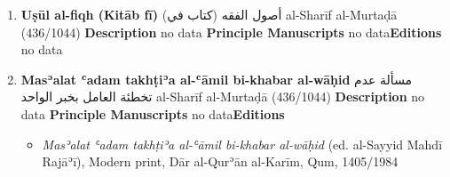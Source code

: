 \documentclass{article}
\begin{document}
\begin{enumerate}
      \item \textbf{Uṣūl al-fiqh (Kitāb fī)}
        \newline
        \textarabic{أصول الفقه (كتاب في)}
        \newline
        al-Sharīf al-Murtaḍā
        \newline
        (436/1044)
        \newline
        \newline
        \textbf{Description}
        \newline	
        no data
        \newline
        \newline
    \textbf{Principle Manuscripts}
\newline
no data\newline\textbf{Editions}
\newline
no data\newline
      \item \textbf{Masʾalat ʿadam takhṭiʾa al-ʿāmil bi-khabar al-wāḥid}
        \newline
        \textarabic{مسألة عدم تخطئة العامل بخبر الواحد}
        \newline
        al-Sharīf al-Murtaḍā
        \newline
        (436/1044)
        \newline
        \newline
        \textbf{Description}
        \newline	
        no data
        \newline
        \newline
    \textbf{Principle Manuscripts}
\newline
no data\newline\textbf{Editions}
\begin{itemize}
        \item \emph{Masʾalat ʿadam takhṭiʾa al-ʿāmil bi-khabar al-wāḥid} (ed. al-Sayyid Mahdī Rajāʾī), Modern print, Dār al-Qurʾān al-Karīm, Qum, 1405/1984
        \end{itemize}


\end{enumerate}
\end{document}
